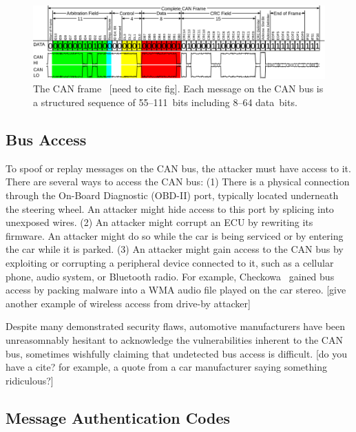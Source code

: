 
	\begin{figure}
		\centering
		\includegraphics[width=\linewidth]{figures/can_frame.png}
		\caption{The CAN frame~\cite{} [need to cite fig].  
		Each message on the CAN bus is a structured sequence of 55--111~bits including 8--64 data~bits.}
		\label{fig-frame}
	\end{figure}

\subsection{Bus Access}

To spoof or replay messages on the CAN bus, the attacker must have access to it.
There are several ways to access the CAN bus:  (1) There is a
physical connection through the On-Board Diagnostic (OBD-II) port, 
typically located underneath the steering wheel.  An attacker might hide
access to this port by splicing into unexposed wires.
(2) An attacker might corrupt an ECU by rewriting its firmware. An attacker might
do so while the car is being serviced or by entering the car while it is parked.
(3) An attacker might gain access to the CAN bus by exploiting or corrupting a peripheral
device connected to it, such as a cellular phone, audio system, or Bluetooth
radio.  For example, Checkowa~\cite{Checkoway-2011} gained bus access by packing 
malware into a WMA audio file played on the car stereo. [give another example
of wireless access from drive-by attacker]

Despite many demonstrated security flaws, automotive 
manufacturers have been unreasomnably hesitant to acknowledge the vulnerabilities inherent to the CAN bus,
sometimes wishfully claiming that undetected bus access is difficult. [do you have a cite? for example,
a quote from a car manufacturer saying something ridiculous?]

\subsection{Message Authentication Codes}

